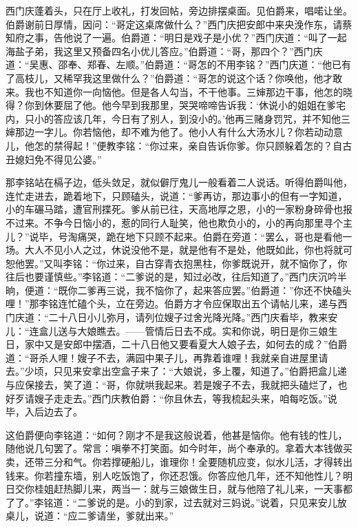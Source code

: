 西门庆蓬着头，只在厅上收礼，打发回帖，旁边排摆桌面。见伯爵来，唱喏让坐。伯爵谢前日厚情，因问：“哥定这桌席做什么？”西门庆把安郎中来央浼作东，请蔡知府之事，告他说了一遍。伯爵道：“明日是戏子是小优？”西门庆道：“叫了一起海盐子弟，我这里又预备四名小优儿答应。”伯爵道：“哥，那四个？”西门庆道：“吴惠、邵奉、郑春、左顺。”伯爵道：“哥怎的不用李铭？”西门庆道：“他已有了高枝儿，又稀罕我这里做什么？”伯爵道：“哥怎的说这个话？你唤他，他才敢来。我也不知道你一向恼他。但是各人勾当，不干他事。三婶那边干事，他怎的晓得？你到休要屈了他。他今早到我那里，哭哭啼啼告诉我：‘休说小的姐姐在爹宅内，只小的答应该几年，今日有了别人，到没小的。’他再三赌身罚咒，并不知他三婶那边一字儿。你若恼他，却不难为他了。他小人有什么大汤水儿？你若动动意儿，他怎的禁得起！”便教李铭：“你过来，亲自告诉你爹。你只顾躲着怎的？自古丑媳妇免不得见公婆。”

那李铭站在槅子边，低头敛足，就似僻厅鬼儿一般看着二人说话。听得伯爵叫他，连忙走进去，跪着地下，只顾磕头，说道：“爹再访，那边事小的但有一字知道，小的车碾马踏，遭官刑揲死。爹从前已往，天高地厚之恩，小的一家粉身碎骨也报不过来。不争今日恼小的，惹的同行人耻笑，他也欺负小的，小的再向那里寻个主儿？”说毕，号淘痛哭，跪在地下只顾不起来。伯爵在旁道：“罢么，哥也是看他一场。大人不见小人之过，休说没他不是，就是他有不是处，他既如此，你也将就可恕他罢。”又叫李铭：“你过来，自古穿青衣抱黑柱，你爹既说开，就不恼你了，你往后也要谨慎些。”李铭道：“二爹说的是，知过必改，往后知道了。”西门庆沉吟半晌，便道：“既你二爹再三说，我不恼你了，起来答应罢。”伯爵道：”你还不快磕头哩！”那李铭连忙磕个头，立在旁边。伯爵方才令应保取出五个请帖儿来，递与西门庆道：“二十八日小儿弥月，请列位嫂子过舍光降光降。”西门庆看毕，教来安儿：“连盒儿送与大娘瞧去。——管情后日去不成。实和你说，明日是你三娘生日，家中又是安郎中摆酒，二十八日他又要看夏大人娘子去，如何去的成？”伯爵道：“哥杀人哩！嫂子不去，满园中果子儿，再靠着谁哩！我就亲自进屋里请去。”少顷，只见来安拿出空盒子来了：“大娘说，多上覆，知道了。”伯爵把盒儿递与应保接去，笑了道：“哥，你就哄我起来。若是嫂子不去，我就把头磕烂了，也好歹请嫂子走走去。”西门庆教伯爵：“你且休去，等我梳起头来，咱每吃饭。”说毕，入后边去了。

这伯爵便向李铭道：“如何？刚才不是我这般说着，他甚是恼你。他有钱的性儿，随他说几句罢了。常言：嗔拳不打笑面。如今时年，尚个奉承的。拿着大本钱做买卖，还带三分和气。你若撑硬船儿，谁理你！全要随机应变，似水儿活，才得转出钱来。你若撞东墙，别人吃饭饱了，你还忍饿。你答应他几年，还不知他性儿？明日交你桂姐赶热脚儿来，两当一：就与三娘做生日，就与他陪了礼儿来，一天事都了了。”李铭道：“二爹说的是。小的到家，过去就对三妈说。”说着，只见来安儿放桌儿，说道：“应二爹请坐，爹就出来。”

